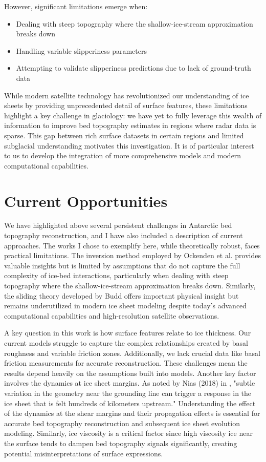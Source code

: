 However, significant limitations emerge when:
\begin{itemize}
    \item Dealing with steep topography where the shallow-ice-stream approximation breaks down
    \item Handling variable slipperiness parameters
    \item Attempting to validate slipperiness predictions due to lack of ground-truth data
\end{itemize}

While modern satellite technology has revolutionized our understanding of ice sheets by providing unprecedented detail of surface features, these limitations highlight a key challenge in glaciology: we have yet to fully leverage this wealth of information to improve bed topography estimates in regions where radar data is sparse. This gap between rich surface datasets in certain regions and limited subglacial understanding motivates this investigation. It is of particular interest to us to develop the integration of more comprehensive models and modern computational capabilities.


\section{Current Opportunities}

We have highlighted above several persistent challenges in Antarctic bed topography reconstruction, and I have also included a description of current approaches. The works I chose to exemplify here, while theoretically robust, faces practical limitations. The inversion method employed by Ockenden et al. provides valuable insights but is limited by assumptions that do not capture the full complexity of ice-bed interactions, particularly when dealing with steep topography where the shallow-ice-stream approximation breaks down. Similarly, the sliding theory developed by Budd offers important physical insight but remains underutilized in modern ice sheet modeling despite today's advanced computational capabilities and high-resolution satellite observations.

A key question in this work is how surface features relate to ice thickness. Our current models struggle to capture the complex relationships created by basal roughness and variable friction zones. Additionally, we lack crucial data like basal friction measurements for accurate reconstruction. These challenges mean the results depend heavily on the assumptions built into models. Another key factor involves the dynamics at ice sheet margins. As noted by Nias (2018) in \cite{Nias_2018}, "subtle variation in the geometry near the grounding line can trigger a response in the ice sheet that is felt hundreds of kilometers upstream." Understanding the effect of the dynamics at the shear margins and their propagation effects is essential for accurate bed topography reconstruction and subsequent ice sheet evolution modeling. Similarly, ice viscosity is a critical factor since high viscosity ice near the surface tends to dampen bed topography signals significantly\cite{deRydt_2013}, creating potential misinterpretations of surface expressions. 

